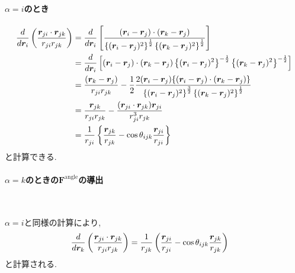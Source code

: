 \paragraph{$\alpha = i$のとき}
\begin{align}
    \frac{d}{d \bm{r}_{i}}
    \left(\frac{\bm{r}_{ji} \cdot \bm{r}_{jk}}{r_{ji} r_{jk}}\right)
 &=
    \frac{d}{d \bm{r}_{i}}
    \left[\frac{(\bm{r}_{i} - \bm{r}_{j}) \cdot (\bm{r}_{k} - \bm{r}_{j})}
               {\left\{ (\bm{r}_{i} - \bm{r}_{j})^{2} \right\}^{\frac{1}{2}}
                \left\{ (\bm{r}_{k} - \bm{r}_{j})^{2} \right\}^{\frac{1}{2}}}
    \right]
 \notag \\
 &=
    \frac{d}{d \bm{r}_{i}}
    \left[(\bm{r}_{i} - \bm{r}_{j}) \cdot (\bm{r}_{k} - \bm{r}_{j})
           \left\{ (\bm{r}_{i} - \bm{r}_{j})^{2} \right\}^{-\frac{1}{2}}
           \left\{ (\bm{r}_{k} - \bm{r}_{j})^{2} \right\}^{-\frac{1}{2}}
    \right]
 \notag \\
 &=
     \frac{(\bm{r}_{k} - \bm{r}_{j})}{r_{ji} r_{jk}}
   - \frac{1}{2}
     \frac{2(\bm{r}_{i} - \bm{r}_{j})
           \{(\bm{r}_{i} - \bm{r}_{j}) \cdot (\bm{r}_{k} - \bm{r}_{j})\}}
          {\left\{ (\bm{r}_{i} - \bm{r}_{j})^{2} \right\}^{\frac{3}{2}}
           \left\{ (\bm{r}_{k} - \bm{r}_{j})^{2} \right\}^{\frac{1}{2}}}
 \notag \\
 &=
     \frac{\bm{r}_{jk}}{r_{ji} r_{jk}}
   - \frac{(\bm{r}_{ji} \cdot \bm{r}_{jk}) \bm{r}_{ji}}{r_{ji}^{3} r_{jk}}
 \notag \\
 &=
     \frac{1}{r_{ji}}
     \left\{
              \frac{\bm{r}_{jk}}{r_{jk}}
            - \cos\theta_{ijk} \frac{\bm{r}_{ji}}{r_{ji}}
     \right\}
\notag
\end{align}
と計算できる.

\paragraph{$\alpha = k$のときの$\bm{F}^{\mathrm{angle}}$の導出} \

$\alpha=i$と同様の計算により, 
\begin{align}
   \frac{d}{d \bm{r}_{k}}
   \left(\frac{\bm{r}_{ji} \cdot \bm{r}_{jk}}{r_{ji} r_{jk}}\right)
&=
   \frac{1}{r_{jk}}
   \left(
           \frac{\bm{r}_{ji}}{r_{ji}}
         - \cos\theta_{ijk} \frac{\bm{r}_{jk}}{r_{jk}}
   \right)
\notag
\end{align}
と計算される. \\

